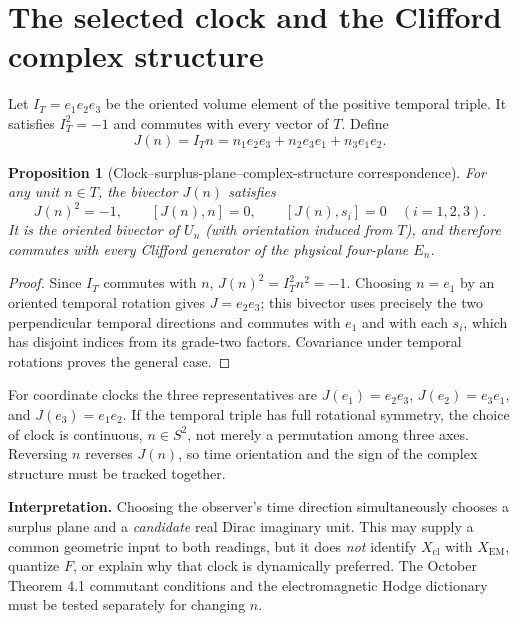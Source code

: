 \documentclass[10.5pt,a4paper]{article}
\newtheorem{proposition}{Proposition}[section]
\newcommand{\Xcl}{X_{\mathrm{cl}}}
\newcommand{\Xem}{X_{\mathrm{EM}}}
\newcommand{\st}[1]{\textcolor{muted}{\small\sffamily [#1]}}
\begin{document}
\section{The selected clock and the Clifford complex structure}
Let $I_T=e_1e_2e_3$ be the oriented volume element of the positive temporal triple. It satisfies $I_T^2=-1$ and commutes with every vector of $T$. Define
\begin{equation}\label{eq:Jn}
 \boxed{J(n)=I_Tn=n_1e_2e_3+n_2e_3e_1+n_3e_1e_2.}
\end{equation}
\begin{proposition}[Clock--surplus-plane--complex-structure correspondence]\label{prop:J}
\st{Proved} For any unit $n\in T$, the bivector $J(n)$ satisfies
\begin{equation}
 J(n)^2=-1,\qquad [J(n),n]=0,\qquad [J(n),s_i]=0\quad(i=1,2,3).
\end{equation}
It is the oriented bivector of $U_n$ (with orientation induced from $T$), and therefore commutes with every Clifford generator of the physical four-plane $E_n$.
\end{proposition}
\begin{proof}
Since $I_T$ commutes with $n$, $J(n)^2=I_T^2n^2=-1$. Choosing $n=e_1$ by an oriented temporal rotation gives $J=e_2e_3$; this bivector uses precisely the two perpendicular temporal directions and commutes with $e_1$ and with each $s_i$, which has disjoint indices from its grade-two factors. Covariance under temporal rotations proves the general case.
\end{proof}
For coordinate clocks the three representatives are $J(e_1)=e_2e_3$, $J(e_2)=e_3e_1$, and $J(e_3)=e_1e_2$. If the temporal triple has full rotational symmetry, the choice of clock is continuous, $n\in S^2$, not merely a permutation among three axes. Reversing $n$ reverses $J(n)$, so time orientation and the sign of the complex structure must be tracked together.

\textbf{Interpretation.} Choosing the observer's time direction simultaneously chooses a surplus plane and a \emph{candidate} real Dirac imaginary unit. This may supply a common geometric input to both readings, but it does \emph{not} identify $\Xcl$ with $\Xem$, quantize $F$, or explain why that clock is dynamically preferred. The October Theorem 4.1 commutant conditions and the electromagnetic Hodge dictionary must be tested separately for changing $n$.
\end{document}
